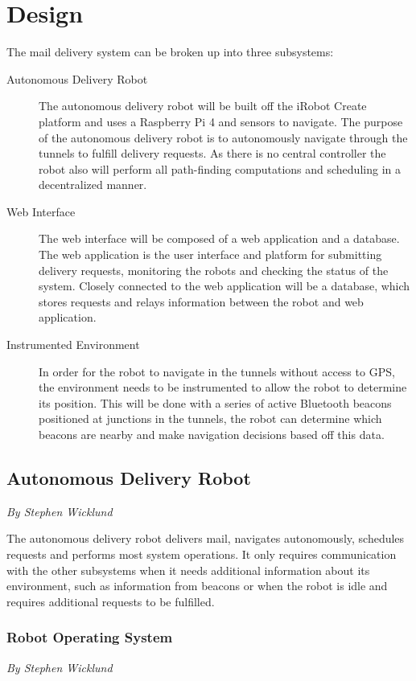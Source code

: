 \documentclass[12pt]{report}
\newcommand{\sectionAuthor}[1]{{\small\vspace{-1em}\textit{#1}}\bigskip\par}
\begin{document}
\chapter{Design}
The mail delivery system can be broken up into three subsystems:
\begin{description}
    \item[Autonomous Delivery Robot] The autonomous delivery robot will be built off the iRobot Create platform and uses a Raspberry Pi 4 and sensors to navigate. The purpose of the autonomous delivery robot is to autonomously navigate through the tunnels to fulfill delivery requests. As there is no central controller the robot also will perform all path-finding computations and scheduling in a decentralized manner.
    \item[Web Interface] The web interface will be composed of a web application and a database. The web application is the user interface and platform for submitting delivery requests, monitoring the robots and checking the status of the system. Closely connected to the web application will be a database, which stores requests and relays information between the robot and web application.
    \item[Instrumented Environment] In order for the robot to navigate in the tunnels without access to GPS, the environment needs to be instrumented to allow the robot to determine its position. This will be done with a series of active Bluetooth beacons positioned at junctions in the tunnels, the robot can determine which beacons are nearby and make navigation decisions based off this data.
\end{description}
\clearpage
\section{Autonomous Delivery Robot}
  \sectionAuthor{By Stephen Wicklund}
  
The autonomous delivery robot delivers mail, navigates autonomously, schedules requests and performs most system operations. It only requires communication with the other subsystems when it needs additional information about its environment, such as information from beacons or when the robot is idle and requires additional requests to be fulfilled.

\subsection{Robot Operating System}
\sectionAuthor{By Stephen Wicklund}
\end{document}
